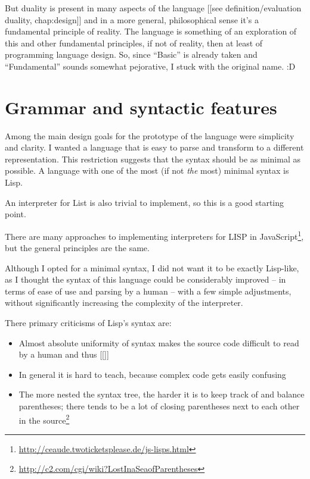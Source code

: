 But duality is present in many aspects of the language [[see definition/evaluation duality, chap:design]] and in a more general, philosophical sense it's a fundamental principle of reality. The language is something of an exploration of this and other fundamental principles, if not of reality, then at least of programming language design. So, since ``Basic'' is already taken and ``Fundamental'' sounds somewhat pejorative, I stuck with the original name. 
:D

\section{Grammar and syntactic features}
Among the main design goals for the prototype of the language were simplicity and clarity. I wanted a language that is easy to parse and transform to a different representation. This restriction suggests that the syntax should be as minimal as possible. A language with one of the most (if not \textit{the} most) minimal syntax is Lisp\cite{syntaxation}.

An interpreter for List is also trivial to implement, so this is a good starting point.

There are many approaches to implementing interpreters for LISP in JavaScript\footnote{\url{http://ceaude.twoticketsplease.de/js-lisps.html}}, but the general principles are the same.

Although I opted for a minimal syntax, I did not want it to be exactly Lisp-like, as I thought the syntax of this language could be considerably improved -- in terms of ease of use and parsing by a human -- with a few simple adjustments, without significantly increasing the complexity of the interpreter.

There primary criticisms of Lisp's syntax are:
\begin{itemize}
    \item Almost absolute uniformity of syntax makes the source code difficult to read by a human and thus [[]]
    \item In general it is hard to teach\cite{wadler_critique}, because complex code gets easily confusing
    \item The more nested the syntax tree, the harder it is to keep track of and balance parentheses; there tends to be a lot of closing parentheses next to each other in the source\footnote{\url{http://c2.com/cgi/wiki?LostInaSeaofParentheses}}
\end{itemize}

